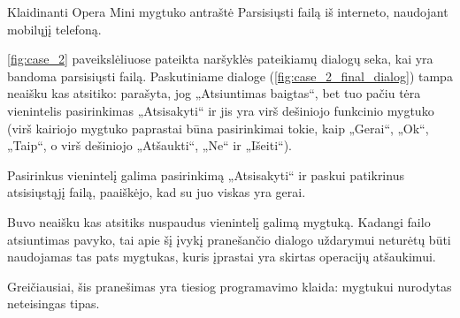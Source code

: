 \begin{xcase}{Klaidinanti Opera Mini mygtuko antraštė}
  \xcgoal
  {
    Parsisiųsti failą iš interneto, naudojant mobilųjį telefoną.
  }
  
  \xctools
  {
    \ref{fig:case_2} paveikslėliuose pateikta naršyklės pateikiamų dialogų
    seka, kai yra bandoma parsisiųsti failą. Paskutiniame dialoge
    (\ref{fig:case_2_final_dialog}) tampa neaišku kas atsitiko: parašyta,
    jog „Atsiuntimas baigtas“, bet tuo pačiu tėra vienintelis
    pasirinkimas „Atsisakyti“ ir jis yra virš dešiniojo funkcinio
    mygtuko (virš kairiojo mygtuko paprastai būna pasirinkimai tokie,
    kaip „Gerai“, „Ok“, „Taip“, o virš dešiniojo „Atšaukti“,
    „Ne“ ir „Išeiti“).
    
    {
    }
  }
  
  \xcresult
  {
    Pasirinkus vienintelį galima pasirinkimą „Atsisakyti“ ir paskui patikrinus
    atsisiųstąjį failą, paaiškėjo, kad su juo viskas yra gerai.
  }
  
  \xcprinciples
  {
    {
      Buvo neaišku kas atsitiks nuspaudus vienintelį galimą mygtuką. 
    }
    {
      Kadangi failo atsiuntimas pavyko, tai apie šį įvykį
      pranešančio dialogo uždarymui neturėtų būti naudojamas tas pats
      mygtukas, kuris įprastai yra skirtas operacijų atšaukimui.
    }
  }
  
  \xcthoughts
  {
    Greičiausiai, šis pranešimas yra tiesiog programavimo klaida: mygtukui
    nurodytas neteisingas tipas.
  }
\end{xcase}
